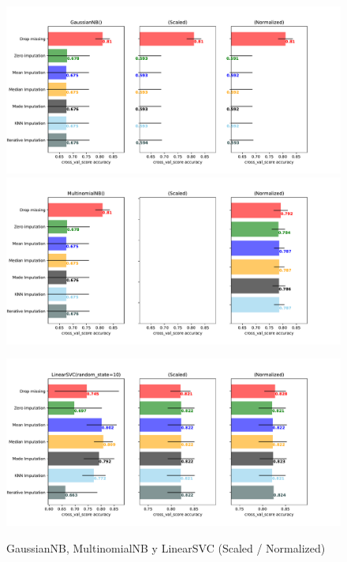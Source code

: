 \documentclass[12pt,twoside]{report}
\begin{document}
\begin{figure}[ht!p]
\caption{GaussianNB, MultinomialNB y LinearSVC (Scaled / Normalized)}
\includegraphics[width=\textwidth]{./code/figures_python/imputation_techniques/imputation_techniques_gnb_scaled_minmax.pdf}%

\includegraphics[width=\textwidth]{./code/figures_python/imputation_techniques/imputation_techniques_multinomial_scaled_minmax.pdf}

\includegraphics[width=\textwidth]{./code/figures_python/imputation_techniques/imputation_techniques_svc_linear_scaled_minmax.pdf}
\label{imputation-scaled-1}
\end{figure}
\end{document}
